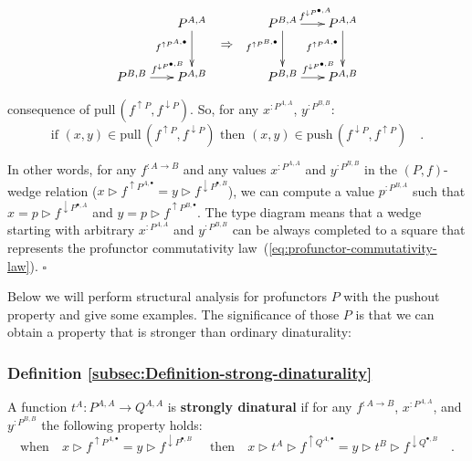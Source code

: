 \begin{wrapfigure}{l}{0.415\columnwidth}%
\vspace{-2.3\baselineskip}
\[
\xymatrix{\xyScaleY{2.3pc}\xyScaleX{1.5pc} & P^{A,A}\ar[d]\sb(0.4){f^{\uparrow P^{A,\bullet}}} & \ar@{}[d]\sb(0.4){\displaystyle \Rightarrow} & P^{B,A}\ar[r]\sp(0.55){f^{\downarrow P^{\bullet,A}}}\ar[d]\sb(0.4){f^{\uparrow P^{B,\bullet}}} & P^{A,A}\ar[d]\sb(0.4){f^{\uparrow P^{A,\bullet}}}\\
P^{B,B}\ar[r]\sp(0.6){f^{\downarrow P^{\bullet,B}}} & P^{A,B} &  & P^{B,B}\ar[r]\sp(0.6){f^{\downarrow P^{\bullet,B}}} & P^{A,B}
}
\]

\vspace{-1.7\baselineskip}
\end{wrapfigure}%

\noindent consequence of $\text{pull}\,(f^{\uparrow P},f^{\downarrow P})$.
So, for any $x^{:P^{A,A}}$, $y^{:P^{B,B}}$:
\[
\text{if }(x,y)\in\text{pull}\,(f^{\uparrow P},f^{\downarrow P})\text{ then }(x,y)\in\text{push}\,(f^{\downarrow P},f^{\uparrow P})\quad.
\]

\noindent In other words, for any $f^{:A\rightarrow B}$ and any values
$x^{:P^{A,A}}$ and $y^{:P^{B,B}}$ in the $\left(P,f\right)$-wedge
relation ($x\triangleright f^{\uparrow P^{A,\bullet}}=y\triangleright f^{\downarrow P^{\bullet,B}}$),
we can compute a value $p^{:P^{B,A}}$ such that $x=p\triangleright f^{\downarrow P^{\bullet,A}}$
and $y=p\triangleright f^{\uparrow P^{B,\bullet}}$. The type diagram
means that a wedge starting with arbitrary $x^{:P^{A,A}}$ and $y^{:P^{B,B}}$
can be always completed to a square that represents the profunctor
commutativity law~(\ref{eq:profunctor-commutativity-law}). $\square$

Below we will perform structural analysis for profunctors $P$ with
the pushout property and give some examples. The significance of those
$P$ is that we can obtain a property that is stronger than ordinary
dinaturality:

\subsubsection{Definition \label{subsec:Definition-strong-dinaturality}\ref{subsec:Definition-strong-dinaturality}}

A function $t^{A}:P^{A,A}\rightarrow Q^{A,A}$ is \textbf{strongly
dinatural} if for any $f^{:A\rightarrow B}$,
$x^{:P^{A,A}}$, and $y^{:P^{B,B}}$ the following property holds:\vspace{-0.3\baselineskip}
\begin{equation}
\text{when}\quad x\triangleright f^{\uparrow P^{A,\bullet}}=y\triangleright f^{\downarrow P^{\bullet,B}}\quad\text{ then}\quad x\triangleright t^{A}\triangleright f^{\uparrow Q^{A,\bullet}}=y\triangleright t^{B}\triangleright f^{\downarrow Q^{\bullet,B}}\quad.\label{eq:strong-dinaturality-law}
\end{equation}

